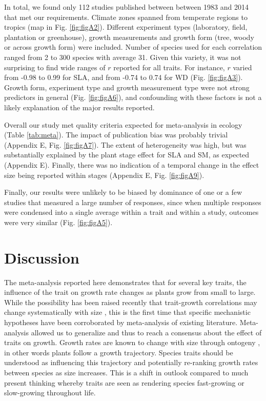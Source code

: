 \documentclass[a4paper,11pt]{article}
\begin{document}
In total, we found only 112 studies published between between 1983 and 2014 that met our requirements. Climate zones spanned from temperate regions to tropics (map in Fig. \ref{fig:figA2}). Different experiment types (laboratory, field, plantation or greenhouse), growth measurements and growth form (tree, woody or across growth form) were included. Number of species used for each correlation ranged from 2 to 300 species with average 31. Given this variety, it was not surprising to find wide ranges of $r$ reported for all traits. For instance, $r$ varied from -0.98 to 0.99 for SLA, and from -0.74 to 0.74 for WD (Fig. \ref{fig:figA3}). Growth form, experiment type and growth measurement type were not strong predictors in general (Fig. \ref{fig:figA6}), and confounding with these factors is not a likely explanation of the major results reported.

Overall our study met quality criteria expected for meta-analysis in ecology (Table \ref{tab:meta}). The impact of publication bias was probably trivial (Appendix E, Fig. \ref{fig:figA7}). The extent of heterogeneity was high, but was substantially explained by the plant stage effect for SLA and SM, as expected (Appendix E). Finally, there was no indication of a temporal change in the effect size being reported within stages (Appendix E, Fig. \ref{fig:figA9}).

Finally, our results were unlikely to be biased by dominance of one or a few studies that measured a large number of responses, since when multiple responses were condensed into a single average within a trait and within a study, outcomes were very similar (Fig. \ref{fig:figA5}).


\section*{Discussion}\label{discussion}

The meta-analysis reported here demonstrates that for several key traits, the influence of the trait on growth rate changes as plants grow from small to large. While the possibility has been raised recently that trait-growth correlations may change systematically with size \citep{Falster:2011ii, Ruger:2012jv, Iida:2014ep, Iida:2014hq}, this is the first time that specific mechanistic hypotheses have been corroborated by meta-analysis of existing literature. Meta-analysis allowed us to generalize and thus to reach a consensus about the effect of traits on growth. Growth rates are known to change with size through ontogeny \citep{Condit:1993hd, Clark:1999ed, Herault:2011dd}, in other words plants follow a growth trajectory. Species traits should be understood as influencing this trajectory and potentially re-ranking growth rates between species as size increases. This is a shift in outlook compared to much present thinking whereby traits are seen as rendering species fast-growing or slow-growing throughout life.
\end{document}

